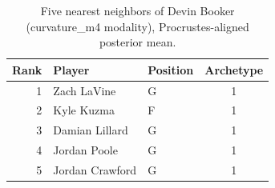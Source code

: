 \begin{table}[htbp]
  \centering\small
  \begin{tabular}{rllc}
    \toprule
    Rank & Player & Position & Archetype \\
    \midrule
    1 & Zach LaVine & G & 1 \\
    2 & Kyle Kuzma & F & 1 \\
    3 & Damian Lillard & G & 1 \\
    4 & Jordan Poole & G & 1 \\
    5 & Jordan Crawford & G & 1 \\
    \bottomrule
  \end{tabular}
  \caption{Five nearest neighbors of Devin Booker (curvature_m4 modality), Procrustes-aligned posterior mean.}
  \label{tab:Devin_Booker_neighbors_curvature_m4}
\end{table}

